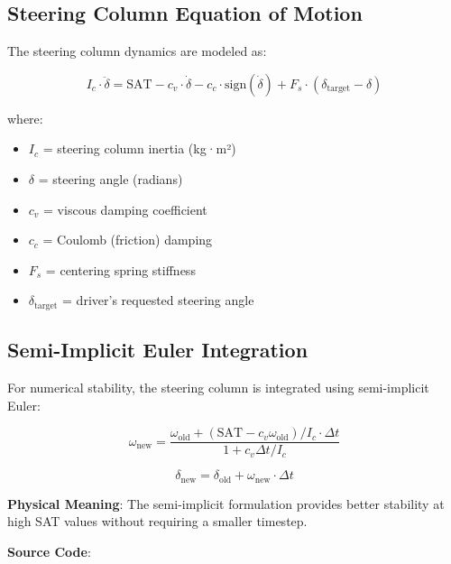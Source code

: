 \subsection{Steering Column Equation of Motion}

The steering column dynamics are modeled as:

\begin{equation}
  I_c \cdot \ddot{\delta} = \text{SAT} - c_v \cdot \dot{\delta} - c_c \cdot \text{sign}(\dot{\delta}) + F_s \cdot (\delta_{\text{target}} - \delta)
  \label{eq:steering-column}
\end{equation}

where:
\begin{itemize}
  \item $I_c$ = steering column inertia (kg·m²)
  \item $\delta$ = steering angle (radians)
  \item $c_v$ = viscous damping coefficient
  \item $c_c$ = Coulomb (friction) damping
  \item $F_s$ = centering spring stiffness
  \item $\delta_{\text{target}}$ = driver's requested steering angle
\end{itemize}

\subsection{Semi-Implicit Euler Integration}

For numerical stability, the steering column is integrated using semi-implicit Euler:

\begin{equation}
  \omega_{\text{new}} = \frac{\omega_{\text{old}} + (\text{SAT} - c_v \omega_{\text{old}}) / I_c \cdot \Delta t}{1 + c_v \Delta t / I_c}
  \label{eq:steering-semi-implicit}
\end{equation}

\begin{equation}
  \delta_{\text{new}} = \delta_{\text{old}} + \omega_{\text{new}} \cdot \Delta t
  \label{eq:steering-angle-update}
\end{equation}

\textbf{Physical Meaning}: The semi-implicit formulation provides better stability at high SAT values without requiring a smaller timestep.

\textbf{Source Code}: 

